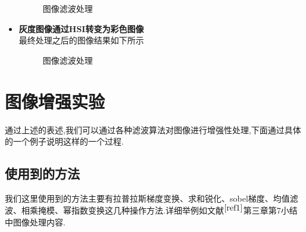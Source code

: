 \documentclass[UTF8,a4paper,10pt]{ctexart}
\begin{document}
\begin{flushleft}
\begin{itemize}
\begin{figure}[htbp]
{\begin{minipage}[t]{0.5\linewidth}
                    \end{minipage}%
                }%
                \caption{图像滤波处理}
                \label{fig:fig_gray_filter_final}
            \end{figure}
            \item \textbf{灰度图像通过HSI转变为彩色图像}\\
            \hspace{2em}最终处理之后的图像结果如下所示
            \begin{figure}[htbp]
                \centering
                \caption{图像滤波处理}
                \label{fig:fig_gray_filter_hsi_final}
            \end{figure}
        \end{itemize}
        \section{图像增强实验}
        \hspace{2em}通过上述的表述,我们可以通过各种滤波算法对图像进行增强性处理,下面通过具体的一个例子说明这样的一个过程.
        \subsection{使用到的方法}
        \hspace{2em}我们这里使用到的方法主要有拉普拉斯梯度变换、求和锐化、sobel梯度、均值滤波、相乘掩模、幂指数变换这几种操作方法.详细举例如文献${}^{\cite{ref1}}$第三章第7小结中图像处理内容.

\end{flushleft}
\end{document}
